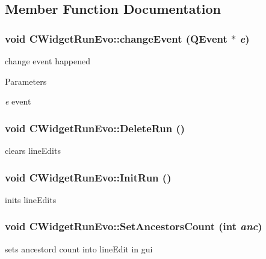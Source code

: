 \subsection{Member Function Documentation}
\hypertarget{classCWidgetRunEvo_a4e9e503239d0f1d2c06369fb39481762}{
\subsubsection[{changeEvent}]{\setlength{\rightskip}{0pt plus 5cm}void CWidgetRunEvo::changeEvent (QEvent $\ast$ {\em e})}}
\label{classCWidgetRunEvo_a4e9e503239d0f1d2c06369fb39481762}
change event happened


\begin{DoxyParams}{Parameters}
\item[{\em e}]event \end{DoxyParams}
\hypertarget{classCWidgetRunEvo_a85c3bfa5797da385ddacdab56a529404}{
\subsubsection[{DeleteRun}]{\setlength{\rightskip}{0pt plus 5cm}void CWidgetRunEvo::DeleteRun ()}}
\label{classCWidgetRunEvo_a85c3bfa5797da385ddacdab56a529404}
clears lineEdits \hypertarget{classCWidgetRunEvo_a2935d7e3239714ed5ee41cdd37159381}{
\subsubsection[{InitRun}]{\setlength{\rightskip}{0pt plus 5cm}void CWidgetRunEvo::InitRun ()}}
\label{classCWidgetRunEvo_a2935d7e3239714ed5ee41cdd37159381}
inits lineEdits \hypertarget{classCWidgetRunEvo_adcde320a6ac35f038635b9b939e1a55a}{
\subsubsection[{SetAncestorsCount}]{\setlength{\rightskip}{0pt plus 5cm}void CWidgetRunEvo::SetAncestorsCount (int {\em anc})}}
\label{classCWidgetRunEvo_adcde320a6ac35f038635b9b939e1a55a}
sets ancestord count into lineEdit in gui


